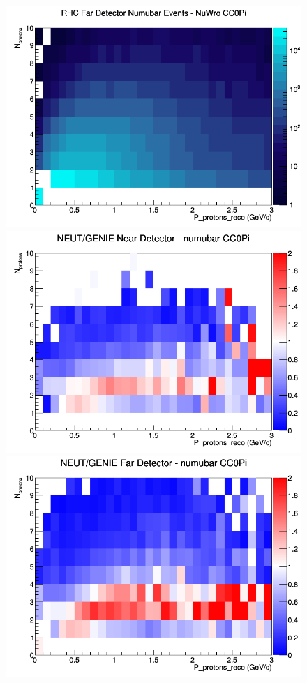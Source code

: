 \begin{figure}[h]
\endminipage
{}
\includegraphics[width=\linewidth]{eff_N_P/FGT/protons/CC0Pi_RHC_FD_numubar_N_P_NuWro.png}
\endminipage
\newline
{}
\includegraphics[width=\linewidth]{eff_N_P/FGT/protons/ratios/CC0Pi_NEUT_GENIE_numubar_near_N_P.png}
\endminipage
{}
\includegraphics[width=\linewidth]{eff_N_P/FGT/protons/ratios/CC0Pi_NEUT_GENIE_numubar_far_N_P.png}

\end{figure}
